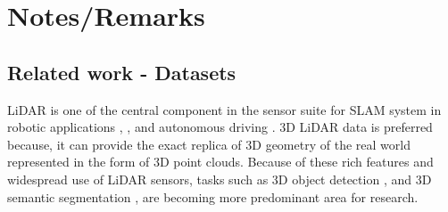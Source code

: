 

\chapter{Notes/Remarks}

\section{Related work - Datasets}
LiDAR is one of the central component in the sensor suite for SLAM system in robotic applications \cite{thrun2006stanley}, \cite{patz2008practical}, \cite{hess20162dSLAM} and autonomous driving \cite{li2016vehicle}.
3D LiDAR data is preferred because, it can provide the exact replica of 3D geometry of the real world represented in the form of 3D point clouds.
Because of these rich features and widespread use of LiDAR sensors, tasks such as 3D object detection \cite{zhou2018voxelnet}, \cite{PIXOR} and 3D semantic segmentation \cite{qi2017pointnet++}, \cite{3Dmininet} are becoming more predominant area for research.

